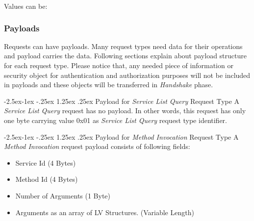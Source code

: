 \documentclass[10pt,a4paper]{article}
\makeatletter
\renewcommand\paragraph{\@startsection{paragraph}{4}{\z@}%
            {-2.5ex\@plus -1ex \@minus -.25ex}%
            {1.25ex \@plus .25ex}%
            {\normalfont\normalsize\bfseries}}
\makeatother
\begin{document}
\noindent
Values can be:
\begin{flushleft}
\end{flushleft}

\subsubsection{Payloads}
Requests can have payloads. Many request types need data for their operations and payload carries the data. Following sections explain about payload structure for each request type. Please notice that, any needed piece of information or security object for authentication and authorization purposes will not be included in payloads and these objects will be transferred in \textit{Handshake} phase.

\paragraph{Payload for \textit{Service List Query} Request Type}
A \textit{Service List Query} request has no payload. In other words, this request has only one byte carrying value 0x01 as \textit{Service List Query} request type identifier.

\paragraph{Payload for \textit{Method Invocation} Request Type}
A \textit{Method Invocation} request payload consists of following fields:
\begin{itemize}
  \item Service Id (4 Bytes)
  \item Method Id (4 Bytes)
  \item Number of Arguments (1 Byte)
  \item Arguments as an array of LV Structures. (Variable Length)
\end{itemize}
\end{document}
